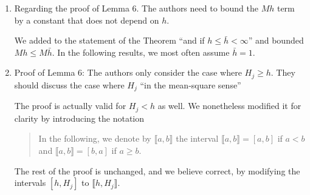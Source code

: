 \documentclass[10pt]{article}
\begin{document}
\begin{enumerate}
	The observation about energy levels and likelihood is modified as
	\begin{quote}
		Hence, initial conditions with a different energy level with respect to the observation are mapped by the approximate forward model to points which are close to the observations, and as a result the posterior distribution is concentrated far from the true value.
	\end{quote} 
	The meaning of the above sentence is that if the approximate forward model is not conserving the Hamiltonian, the energy state of the approximate solution at time $t$ will be different than the one of the initial condition. Let us assume without loss of generality that the numerical integrator causes a positive drift in energy. In this case, an initial condition with a lower energy than the observations will be ``seen'' under the posterior as the most likely. Conversely, if the forward map conserves (i.e., approximately conserves) the Hamiltonian, \textit{at least} the correctness on the energy for the solution of the inverse problem with respect to the observations can be trusted.
	\item 
	\begin{itquote}
		{\normalfont Regarding the proof of Lemma 6.} The authors need to bound the $Mh$ term by a constant that does not depend on $h$.
	\end{itquote}
	We added to the statement of the Theorem ``and if $h \leq \bar h < \infty$'' and bounded $Mh \leq M\bar h$. In the following results, we most often assume $\bar h = 1$.
	\item 
	\begin{itquote}
		 Proof of Lemma 6: The authors only consider the case where $H_j\geq h$. They should discuss the case where $H_j$ ``in the mean-square sense''
	\end{itquote}
	The proof is actually valid for $H_j < h$ as well. We nonetheless modified it for clarity by introducing the notation
	\begin{quote}
		In the following, we denote by $\llbracket a, b \rrbracket$ the interval $\llbracket a, b \rrbracket = [a, b]$ if $a < b$ and $\llbracket a, b \rrbracket = [b, a]$ if $a \geq b$.
	\end{quote}
	The rest of the proof is unchanged, and we believe correct, by modifying the intervals $[h, H_j]$ to $\llbracket h, H_j \rrbracket$.
\end{enumerate}
\end{document}
